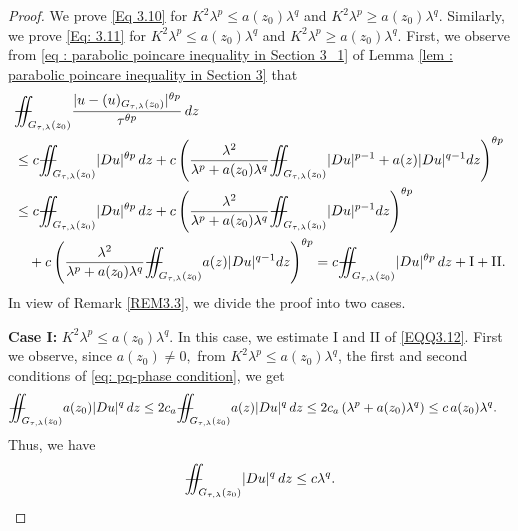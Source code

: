 \documentclass[notitlepage,11pt,reqno]{amsart}
\theoremstyle{definition}
\numberwithin{equation}{section}
\newcommand{\iintss}{{\int\hspace{-0.28cm}\int}}
\newcommand{ \miints }{{\iintss\hspace{-0.56cm} -\hspace{-0.15cm}-}}
\newcommand{\miint}[1]{{\miints_{\hspace{-0.13cm}#1}}}
\begin{document}
\begin{proof} We prove \eqref{Eq 3.10} for $K^2\lambda^p\leq a(z_0)\lambda^q$ and $K^2\lambda^p\geq a(z_0)\lambda^q.$ Similarly, we prove \eqref{Eq: 3.11} for $K^2\lambda^p\leq a(z_0)\lambda^q$ and $K^2\lambda^p\geq a(z_0)\lambda^q.$
First, we observe from \eqref{eq : parabolic poincare inequality in Section 3_1} of Lemma \ref{lem : parabolic poincare inequality in Section 3} that
\begin{align}\label{EQQ3.12}
    &\miint{G_{\tau, \lambda}(z_0)}\frac{|u-(u)_{G_{\tau, \lambda}(z_0)}|^{\theta p}}{\tau^{\theta p}}\,dz\nonumber\\
    &\leq c\miint{G_{\tau, \lambda}(z_0)}|Du|^{\theta p}\, dz + c\left(\frac{\lambda^2}{\lambda^p+a(z_0)\lambda^q}\miint{G_{\tau, \lambda}(z_0)}|Du|^{p-1}+a(z)|Du|^{q-1} dz\right)^{\theta p}\nonumber\\
    &\leq c\miint{G_{\tau, \lambda}(z_0)}|Du|^{\theta p}\, dz+ c\left(\frac{\lambda^2}{\lambda^p+a(z_0)\lambda^q}\miint{G_{\tau, \lambda}(z_0)}|Du|^{p-1} dz\right)^{\theta p}\nonumber\\
    &\quad +c\left(\frac{\lambda^2}{\lambda^p+a(z_0)\lambda^q}\miint{G_{\tau, \lambda}(z_0)}a(z)|Du|^{q-1} dz\right)^{\theta p}=c\miint{G_{\tau, \lambda}(z_0)}|Du|^{\theta p}\, dz+\mathrm{I}+\mathrm{II}.
\end{align}
In view of Remark \ref{REM3.3}, we divide the proof into two cases.

\textbf{Case I:} $K^2\lambda^p\leq a(z_0)\lambda^q.$ In this case, we estimate $\mathrm{I}$ and $\mathrm{II}$ of \eqref{EQQ3.12}. First we observe, since $a(z_0)\neq 0,$ from $K^2\lambda^p\leq a(z_0)\lambda^q$, the first and second conditions of \eqref{eq: pq-phase condition}, we get
\begin{align*}
 \miint{G_{\tau, \lambda}(z_0)} a(z_0)|Du|^q\,dz \leq 2 c_a \miint{G_{\tau, \lambda}(z_0)} a(z)|Du|^q\,dz&\leq 2c_a \left(\lambda^p+a(z_0)\lambda^q\right)\leq c\, a(z_0)\lambda^q.
\end{align*}
Thus, we have
\begin{align}\label{bound by q}
    \miint{G_{\tau, \lambda}(z_0)}|Du|^q\, dz \leq c\lambda^q.
\end{align}


\end{proof}
\end{document}
